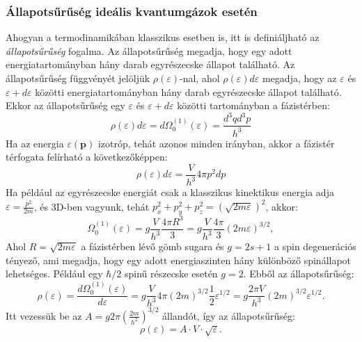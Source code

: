 \documentclass[../main.tex]{subfiles}
\begin{document}
\subsubsection{Állapotsűrűség ideális kvantumgázok esetén}
Ahogyan a termodinamikában klasszikus esetben is, itt is definiáljható az \textit{állapotsűrűség} fogalma. Az állapotsűrűség megadja, hogy egy adott energiatartományban
hány darab egyrészecske állapot található. Az állapotsűrűség függvényét jelöljük $\rho(\varepsilon)$-nal, ahol $\rho(\varepsilon) d\varepsilon$ megadja, hogy az $\varepsilon$ és $\varepsilon + d\varepsilon$ közötti energiatartományban
hány darab egyrészecske állapot található. Ekkor az állapotsűrűség egy $\varepsilon$ és $\varepsilon + d\varepsilon$ közötti tartományban a fázistérben:
\begin{equation}
    \rho(\varepsilon)d\varepsilon = d\Omega^{(1)}_0 (\varepsilon) = \frac{d^3q d^3p}{h^3} 
\end{equation}
Ha az energia $\varepsilon(\mathbf{p})$ izotróp, tehát azonos minden irányban, akkor a fázistér térfogata felírható a következőképpen:
\begin{equation}
    \rho(\varepsilon)d\varepsilon = \frac{V}{h^3} 4 \pi p^2 dp
\end{equation}
Ha például az egyrészecske energiát csak a klasszikus kinektikus energia adja $\varepsilon = \frac{p^2}{2m}$, és 3D-ben vagyunk, tehát $p^2_x + p^2_y + p^2_z = (\sqrt{2m\varepsilon})^2$, akkor:
\begin{equation}
    \Omega^{(1)}_0 (\varepsilon) = g \frac{V}{h^3} \frac{4\pi R^3}{3} = g \frac{V}{h^3} \frac{4 \pi}{3} (2m\varepsilon)^{3/2},
\end{equation}
Ahol $R = \sqrt{2m\varepsilon}$ a fázistérben lévő gömb sugara és $g = 2s + 1$ a spin degenerációs tényező, ami megadja, hogy egy adott energiaszinten hány különböző spinállapot lehetséges. Például egy $\hbar/2$ spinű részecske esetén $g=2$.
Ebből az állapotsűrűség:
\begin{equation}
    \rho(\varepsilon) = \frac{d\Omega^{(1)}_0 (\varepsilon)}{d\varepsilon} = g \frac{V}{h^3} 4 \pi (2m)^{3/2} \frac{1}{2} \varepsilon^{1/2} = g \frac{2\pi V}{h^3} (2m)^{3/2} \varepsilon^{1/2}.
\end{equation}
Itt vezessük be az $A = g 2 \pi \left(\frac{2m}{h^2}\right)^{3/2}$ állandót, így az állapotsűrűség:
\begin{equation}
    \boxed{
    \rho(\varepsilon) = A \cdot V \cdot \sqrt{\varepsilon}.
    }
\end{equation}
\end{document}
